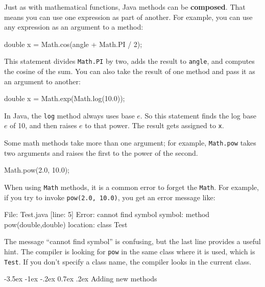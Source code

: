 \documentclass[12pt]{book}
\makeatletter
\theoremstyle{exercise}
\newcommand{\java}[1]{\verb"#1"}
\renewcommand{\section}{\@startsection{section}{1}{\z@}%
    {-3.5ex \@plus -1ex \@minus -.2ex}%
    {0.7ex \@plus.2ex}%
    {\normalfont\Large\bfseries}}
\newcommand{\java}[1]{\lstinline{#1}} %
\makeatother
\begin{document}

Just as with mathematical functions, Java methods can be {\bf composed}.
That means you can use one expression as part of another.
For example, you can use any expression as an argument to a method:

\begin{code}
    double x = Math.cos(angle + Math.PI / 2);
\end{code}

This statement divides \java{Math.PI} by two, adds the result to \java{angle}, and computes the cosine of the sum.
You can also take the result of one method and pass it as an argument to another:

\begin{code}
    double x = Math.exp(Math.log(10.0));
\end{code}

In Java, the \java{log} method always uses base $e$.
So this statement finds the log base $e$ of 10, and then raises $e$ to that power.
The result gets assigned to \java{x}.

Some math methods take more than one argument;
for example, \java{Math.pow} takes two arguments and raises the first to the power of the second.

\begin{code}
    Math.pow(2.0, 10.0);
\end{code}

When using \java{Math} methods, it is a common error to forget the \java{Math}.
For example, if you try to invoke \java{pow(2.0, 10.0)}, you get an error message like:

\begin{stdout}
File: Test.java  [line: 5]
Error: cannot find symbol
  symbol:   method pow(double,double)
  location: class Test
\end{stdout}

The message ``cannot find symbol'' is confusing, but the last line provides a useful hint.
The compiler is looking for \java{pow} in the same class where it is used, which is \java{Test}.
If you don't specify a class name, the compiler looks in the current class.


\section{Adding new methods}
\label{adding_methods}

\end{document}

